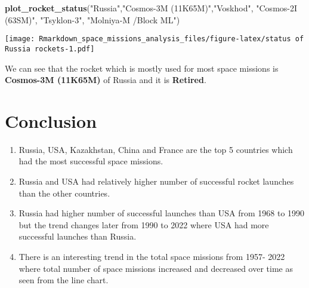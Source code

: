 \documentclass[
]{article}
\newenvironment{Shaded}{\begin{snugshade}}{\end{snugshade}}
\newcommand{\FunctionTok}[1]{\textcolor[rgb]{0.13,0.29,0.53}{\textbf{#1}}}
\newcommand{\NormalTok}[1]{#1}
\newcommand{\StringTok}[1]{\textcolor[rgb]{0.31,0.60,0.02}{#1}}
\begin{document}
\begin{Shaded}
\begin{Highlighting}[]
\FunctionTok{plot\_rocket\_status}\NormalTok{(}\StringTok{"Russia"}\NormalTok{,}\StringTok{"Cosmos{-}3M (11K65M)"}\NormalTok{,}\StringTok{"Voskhod"}\NormalTok{, }\StringTok{"Cosmos{-}2I (63SM)"}\NormalTok{, }\StringTok{"Tsyklon{-}3"}\NormalTok{, }\StringTok{"Molniya{-}M /Block ML"}\NormalTok{)}
\end{Highlighting}
\end{Shaded}

\texttt{[image: Rmarkdown\_space\_missions\_analysis\_files/figure-latex/status of Russia rockets-1.pdf]}

We can see that the rocket which is mostly used for most space missions
is \textbf{Cosmos-3M (11K65M)} of Russia and it is \textbf{Retired}.

\hypertarget{conclusion}{%
\section{Conclusion}\label{conclusion}}

\begin{enumerate}
\def\labelenumi{\arabic{enumi}.}
\item
  Russia, USA, Kazakhstan, China and France are the top 5 countries
  which had the most successful space missions.
\item
  Russia and USA had relatively higher number of successful rocket
  launches than the other countries.
\item
  Russia had higher number of successful launches than USA from 1968 to
  1990 but the trend changes later from 1990 to 2022 where USA had more
  successful launches than Russia.
\item
  There is an interesting trend in the total space missions from 1957-
  2022 where total number of space missions increased and decreased over
  time as seen from the line chart.
\end{enumerate}
\end{document}
